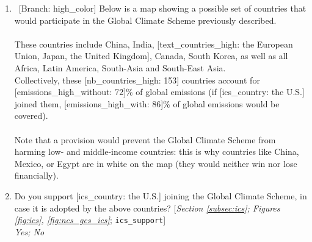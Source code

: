 \begin{enumerate}[resume]
\item ~[Branch: high\_color]  \label{q:gcs_high_color} Below is a map showing a possible set of countries that would participate in the Global Climate Scheme previously described.\\
~\\
These countries include China, India, [text\_countries\_high: the European Union, Japan, the United Kingdom], Canada, South Korea, as well as all Africa, Latin America, South-Asia and South-East Asia. \\
Collectively, these [nb\_countries\_high: 153] countries account for [emissions\_high\_without: 72]\% of global emissions (if [ics\_country: the U.S.] joined them, [emissions\_high\_with: 86]\% of global emissions would be covered).\\\\Note that a provision would prevent the Global Climate Scheme from harming low- and middle-income countries: this is why countries like China, Mexico, or Egypt are in white on the map (they would neither win nor lose financially).\\


\item  \label{q:ics_support} Do you support [ics\_country: the U.S.] joining the Global Climate Scheme, in case it is adopted by the above countries? [\textit{Section \ref{subsec:ics}; Figures \ref{fig:ics}, \ref{fig:ncs_gcs_ics}}; 
\verb|ics_support|]
  \\ \textit{Yes; No}

\end{enumerate} 


